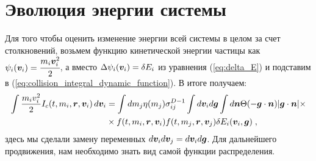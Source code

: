 \section{Эволюция энергии системы}
Для того чтобы оценить изменение энергии всей системы в целом за счет столкновений, возьмем функцию кинетической энергии
частицы как $\psi_i(\bm{v}_i) = \cfrac{m_i\bm{v}^2_i}{2}$, а вместо $\Delta\psi_i(\bm{v}_i)=\delta E_i$ из уравнения (\ref{eq:delta_E}) и подставим
в (\ref{eq:collision_integral_dynamic_function}). В итоге получаем:
\begin{equation}\label{eq:energy_collision_evolution}
  \begin{split}
    \int\frac{m_iv^2_i}{2}I_c(t,m_i,\bm{r},\bm{v}_i)\,d\bm{v}_i &= \int dm_j\eta(m_j)\sigma^{D-1}_{ij}
    \int d\bm{v}_id\bm{g}\int d\bm{n}\Theta(-\bm{g}\cdot\bm{n})\vert\bm{g}\cdot\bm{n}\vert\times\\
    &\times f(t,m_i,\bm{r},\bm{v}_i)f(t,m_j,\bm{r},\bm{v}_j)\delta E_i(\bm{v}_i,\bm{g})\;,
  \end{split}
\end{equation}
здесь мы сделали замену переменных $d\bm{v}_id\bm{v}_j=d\bm{v}_id\bm{g}$. Для дальнейшего продвижения, нам необходимо знать вид самой функции распределения.

